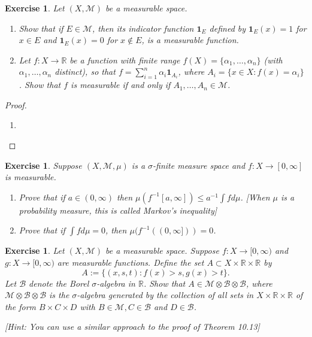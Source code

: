 \documentclass{article}
\newtheorem{exercise}[theorem]{Exercise}
\begin{document}
\begin{exercise}
Let \((X, \mathcal{M})\) be a measurable space.
\begin{enumerate}   
\item[(a)] Show that if \( E \in \mathcal{M} \), then its indicator function \( \mathbf{1}_E \) defined by \( \mathbf{1}_E(x) = 1 \) for \( x \in E \) and \( \mathbf{1}_E(x) = 0 \) for \( x \notin E \), is a measurable function.
    
\item[(b)] Let \( f : X \to \mathbb{R} \) be a function with finite range \( f(X) = \{\alpha_1, \dots, \alpha_n\} \) (with \( \alpha_1, \dots, \alpha_n \) distinct), so that \( f = \sum_{i=1}^{n} \alpha_i \mathbf{1}_{A_i} \), where \( A_i = \{ x \in X : f(x) = \alpha_i \} \). Show that \( f \) is measurable if and only if \( A_1, \dots, A_n \in \mathcal{M} \).
\end{enumerate}
\end{exercise}
\begin{proof}
\begin{enumerate}
    \item[(a)] 
\end{enumerate}
\end{proof}
\begin{exercise}
Suppose \((X, \mathcal{M}, \mu)\) is a \(\sigma\)-finite measure space and \( f : X \to [0, \infty] \) is measurable.
\begin{enumerate}   
\item[(a)] Prove that if \( a \in (0, \infty) \) then \( \mu(f^{-1}[a, \infty]) \leq a^{-1} \int f d\mu \). [When \( \mu \) is a probability measure, this is called \textit{Markov's inequality}]
    
\item[(b)] Prove that if \( \int f d\mu = 0 \), then \( \mu(f^{-1}((0, \infty])) = 0 \).
\end{enumerate}
\end{exercise}
\begin{exercise}
Let \((X, \mathcal{M})\) be a measurable space. Suppose \( f : X \to [0, \infty) \) and \( g : X \to [0, \infty) \) are measurable functions. Define the set \( A \subset X \times \mathbb{R} \times \mathbb{R} \) by 
    \[
    A := \{(x, s, t) : f(x) > s, g(x) > t\}.
    \]
    Let \( \mathcal{B} \) denote the Borel \(\sigma\)-algebra in \( \mathbb{R} \). Show that \( A \in \mathcal{M} \otimes \mathcal{B} \otimes \mathcal{B} \), where \( \mathcal{M} \otimes \mathcal{B} \otimes \mathcal{B} \) is the \(\sigma\)-algebra generated by the collection of all sets in \( X \times \mathbb{R} \times \mathbb{R} \) of the form \( B \times C \times D \) with \( B \in \mathcal{M}, C \in \mathcal{B} \) and \( D \in \mathcal{B} \).

    [\textit{Hint: You can use a similar approach to the proof of Theorem 10.13}]
\end{exercise}
\end{document}
